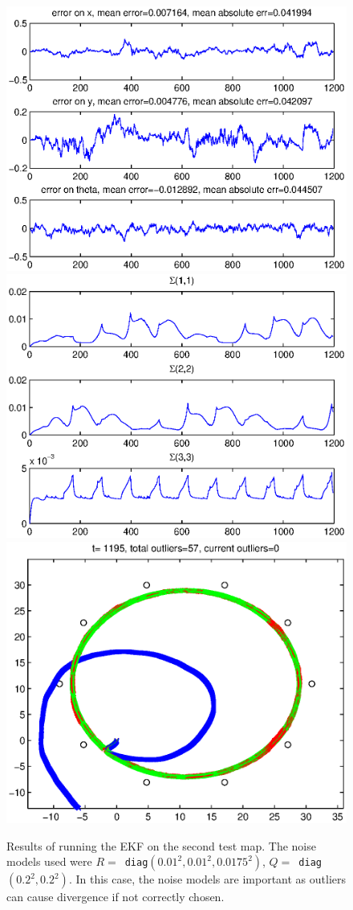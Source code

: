 \documentclass[a4paper,12pt]{article}
\begin{document}
\begin{figure}
  \centerline
  {
    \includegraphics[width=.43\textwidth]{figures/ekf/map2_seq_error}
    \includegraphics[width=.43\textwidth]{figures/ekf/map2_seq_sigma}
    \includegraphics[width=.43\textwidth]{figures/ekf/map2_seq_motion}
  }
  \caption{Results of running the EKF on the second test map. The noise models
    used were $R=$~\texttt{diag}$(0.01^2, 0.01^2, 0.0175^2)$,
    $Q=$~\texttt{diag}$(0.2^2, 0.2^2)$. In this case, the noise models are
    important as outliers can cause divergence if not correctly chosen.}
  \label{fig:map2}
\end{figure}
\end{document}
